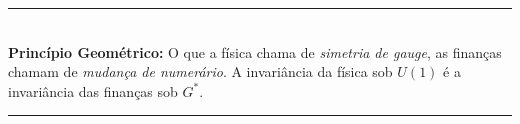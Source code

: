 \vspace{12pt}
\begin{center}
\rule{0.4\textwidth}{0.5pt}\\[4pt]
{\small \textbf{Princ\'ipio Geom\'etrico:} O que a f\'isica chama de
\emph{simetria de gauge}, as finan\c{c}as chamam de \emph{mudan\c{c}a
de numer\'ario}. A invari\^ancia da f\'isica sob $U(1)$ \'e a
invari\^ancia das finan\c{c}as sob $G^*$.}\\[4pt]
\rule{0.4\textwidth}{0.5pt}
\end{center}


